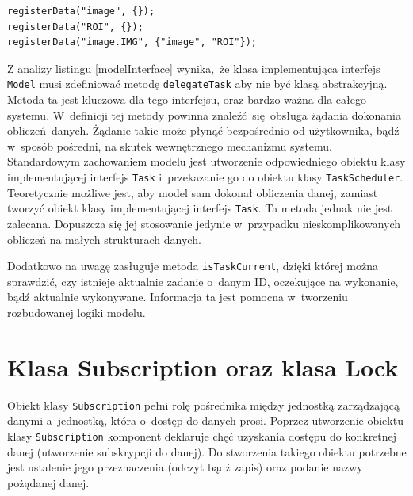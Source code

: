 \begin{minipage}{\textwidth}
	\begin{lstlisting}[label=model:registerData, caption={Przykłady rejestrowania danych},alsoletter={()[].=}]
registerData("image", {});
registerData("ROI", {});
registerData("image.IMG", {"image", "ROI"});
	\end{lstlisting}
\end{minipage}

Z analizy listingu \ref{modelInterface} wynika, że klasa implementująca interfejs \lstinline$Model$ musi zdefiniować metodę \lstinline$delegateTask$ aby nie być klasą abstrakcyjną. Metoda ta jest kluczowa dla tego interfejsu, oraz bardzo ważna dla całego systemu. W~definicji tej metody powinna znaleźć się obsługa żądania dokonania obliczeń danych. Żądanie takie może płynąć bezpośrednio od użytkownika, bądź w~sposób pośredni, na skutek wewnętrznego mechanizmu systemu. Standardowym zachowaniem modelu jest utworzenie odpowiedniego obiektu klasy implementującej interfejs \lstinline$Task$ i~przekazanie go do obiektu klasy \lstinline$TaskScheduler$. Teoretycznie możliwe jest, aby model sam dokonał obliczenia danej, zamiast tworzyć obiekt klasy implementującej interfejs \lstinline$Task$. Ta metoda jednak nie jest zalecana. Dopuszcza się jej stosowanie jedynie w~przypadku nieskomplikowanych obliczeń na małych strukturach danych. 

Dodatkowo na uwagę zasługuje metoda \lstinline$isTaskCurrent$, dzięki której można sprawdzić, czy istnieje aktualnie zadanie o~danym ID, oczekujące na wykonanie, bądź aktualnie wykonywane. Informacja ta jest pomocna w~tworzeniu rozbudowanej logiki modelu.

\section{Klasa Subscription oraz klasa Lock}
Obiekt klasy \lstinline$Subscription$ pełni rolę pośrednika między jednostką zarządzającą danymi a~jednostką, która o~dostęp do danych prosi. Poprzez utworzenie obiektu klasy \lstinline$Subscription$ komponent deklaruje chęć uzyskania dostępu do konkretnej danej (utworzenie subskrypcji do danej). Do stworzenia takiego obiektu potrzebne jest ustalenie jego przeznaczenia (odczyt bądź zapis) oraz podanie nazwy pożądanej danej.
 
